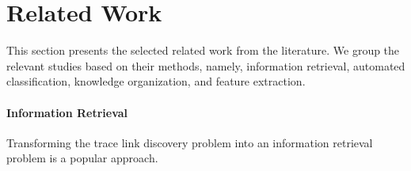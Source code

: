 \section{Related Work}
\label{sec:relwork}

This section presents the selected related work from the literature. We group the relevant studies based on their methods, namely, information retrieval, automated classification, knowledge organization, and feature extraction.


\paragraph{Information Retrieval} Transforming the trace link discovery problem into an information retrieval problem is a popular approach. %

